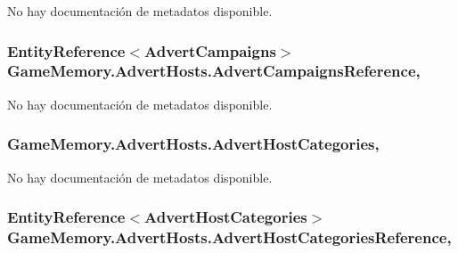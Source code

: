 No hay documentación de metadatos disponible. 

\hypertarget{class_game_memory_1_1_advert_hosts_ac1362cf9f56041ecda1da4beee7cd9b2}{
\subsubsection[{Advert\-Campaigns\-Reference}]{\setlength{\rightskip}{0pt plus 5cm}Entity\-Reference$<${\bf Advert\-Campaigns}$>$ Game\-Memory.\-Advert\-Hosts.\-Advert\-Campaigns\-Reference\hspace{0.3cm}{\ttfamily [get]}, {\ttfamily [set]}}}\label{class_game_memory_1_1_advert_hosts_ac1362cf9f56041ecda1da4beee7cd9b2}


No hay documentación de metadatos disponible. 

\hypertarget{class_game_memory_1_1_advert_hosts_ac76d2a1c64a2108e2caeb0ba0ec783eb}{
\subsubsection[{Advert\-Host\-Categories}]{ Game\-Memory.\-Advert\-Hosts.\-Advert\-Host\-Categories\hspace{0.3cm}{\ttfamily [get]}, {\ttfamily [set]}}}\label{class_game_memory_1_1_advert_hosts_ac76d2a1c64a2108e2caeb0ba0ec783eb}


No hay documentación de metadatos disponible. 

\hypertarget{class_game_memory_1_1_advert_hosts_a90144e6cd1a7c13e64a210d9fb84bb30}{
\subsubsection[{Advert\-Host\-Categories\-Reference}]{\setlength{\rightskip}{0pt plus 5cm}Entity\-Reference$<${\bf Advert\-Host\-Categories}$>$ Game\-Memory.\-Advert\-Hosts.\-Advert\-Host\-Categories\-Reference\hspace{0.3cm}{\ttfamily [get]}, {\ttfamily [set]}}}\label{class_game_memory_1_1_advert_hosts_a90144e6cd1a7c13e64a210d9fb84bb30}


